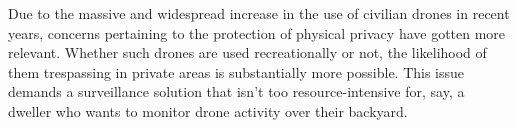 Due to the massive and widespread increase in the use of civilian drones in recent years, concerns pertaining to the protection of physical privacy have gotten more relevant. Whether such drones are used recreationally or not, the likelihood of them trespassing in private areas is substantially more possible. This issue demands a surveillance solution that isn\textquotesingle’t too resource-intensive for, say, a dweller who wants to monitor drone activity over their backyard.
